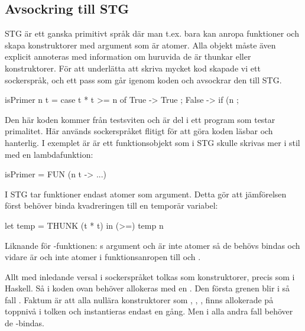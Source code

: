 \documentclass[../Core]{subfiles}
\begin{document}
\subsection{Avsockring till STG}
\label{sec:Diabetes}

\overviewSugar

STG är ett ganska primitivt språk där man t.ex. bara kan anropa funktioner
och skapa konstruktorer med argument som är atomer. Alla objekt måste även
explicit annoteras med information om huruvida de är thunkar eller konstruktorer. För att underlätta
att skriva mycket kod skapade vi ett sockerspråk, och ett
pass som går igenom koden och avsockrar den till STG.

\begin{codeEx}
isPrimer n t = case t * t >= n of
    { True -> True
    ; False -> if (n %
    };
\end{codeEx}

Den här koden kommer från testsviten och är del i ett program som testar
primalitet. Här används sockerspråket flitigt för att göra koden läsbar
och hanterlig. I exemplet är  är ett funktionsobjekt som i 
STG skulle skrivas mer i stil med en lambdafunktion:

\begin{codeEx}          
isPrimer = FUN (n t -> ...)
\end{codeEx}


I STG tar funktioner endast atomer som argument. Detta gör att 
jämförelsen  först behöver binda kvadreringen
till en temporär variabel:

\begin{codeEx}
let temp = THUNK (t * t)
in  (>=) temp n
\end{codeEx}

Liknande för -funktionen: s argument  och 
 är inte atomer så de behövs bindas och vidare
är  och  inte atomer i  
funktionsanropen till \miniCode{==} och .


Allt med inledande versal i sockerspråket tolkas som konstruktorer,
precis som i Haskell. Så  i koden ovan behöver allokeras med
en . Den första grenen blir i så fall
  .
Faktum är att alla nullära konstruktorer som , , , finns 
allokerade på toppnivå i tolken och instantieras endast en gång. 
Men i alla andra fall behöver de -bindas.
\end{document}
